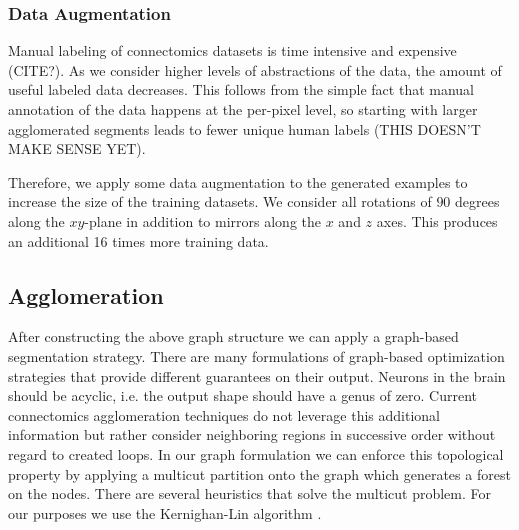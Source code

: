 \subsubsection{Data Augmentation}

Manual labeling of connectomics datasets is time intensive and expensive (CITE?). As we consider higher levels of abstractions of the data, the amount of useful labeled data decreases. This follows from the simple fact that manual annotation of the data happens at the per-pixel level, so starting with larger agglomerated segments leads to fewer unique human labels (THIS DOESN'T MAKE SENSE YET). 

Therefore, we apply some data augmentation to the generated examples to increase the size of the training datasets. We consider all rotations of $90$ degrees along the $xy$-plane in addition to mirrors along the $x$ and $z$ axes. This produces an additional 16 times more training data. 

\subsection{Agglomeration}

After constructing the above graph structure we can apply a graph-based segmentation strategy. There are many formulations of graph-based optimization strategies that provide different guarantees on their output. Neurons in the brain should be acyclic, i.e. the output shape should have a genus of zero. Current connectomics agglomeration techniques do not leverage this additional information but rather consider neighboring regions in successive order without regard to created loops. In our graph formulation we can enforce this topological property by applying a multicut partition onto the graph which generates a forest on the nodes. There are several heuristics that solve the multicut problem. For our purposes we use the Kernighan-Lin algorithm \cite{kernighan1970efficient}.